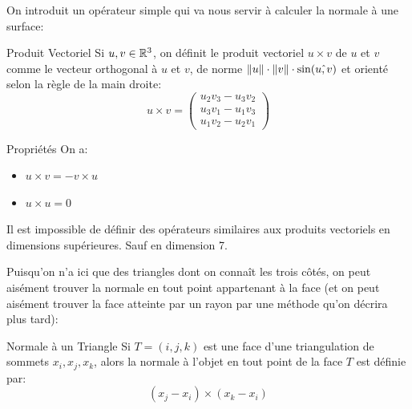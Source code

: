 \documentclass{classe}
\begin{document}
On introduit un opérateur simple qui va nous servir à calculer la normale à une surface:
\begin{définition}{Produit Vectoriel}{}
	Si $u, v \in \mathbb{R}^{3}$, on définit le produit vectoriel $u \times v$ de $u$ et $v$ comme le vecteur orthogonal à $u$ et $v$, de norme $\left\lVert u \right\rVert\cdot\left\lVert v \right\rVert\cdot\sin(\hat{u, v})$ et orienté selon la règle de la main droite:
	\begin{equation*}
		u \times v = \begin{pmatrix}
			u_{2}v_{3} - u_{3}v_{2}\\
			u_{3}v_{1} - u_{1}v_{3}\\
			u_{1}v_{2} - u_{2}v_{1}
		\end{pmatrix}
	\end{equation*}
\end{définition}
\begin{propositionfr}{Propriétés}{}
	On a:
	\begin{itemize}
		\item $u\times v = -v\times u$
		\item $u\times u = 0$
	\end{itemize}
\end{propositionfr}

\begin{remarque}{}{}
	Il est impossible de définir des opérateurs similaires aux produits vectoriels en dimensions supérieures. Sauf en dimension 7.
\end{remarque}

Puisqu'on n'a ici que des triangles dont on connaît les trois côtés, on peut aisément trouver la normale en tout point appartenant à la face (et on peut aisément trouver la face atteinte par un rayon par une méthode qu'on décrira plus tard):
\begin{propositionfr}{Normale à un Triangle}{}
	Si $T = (i, j, k)$ est une face d'une triangulation de sommets $x_{i}, x_{j}, x_{k}$, alors la normale à l'objet en tout point de la face $T$ est définie par:
	\begin{equation*}
		(x_{j} - x_{i}) \times (x_{k} - x_{i})
	\end{equation*}
\end{propositionfr}
\end{document}
